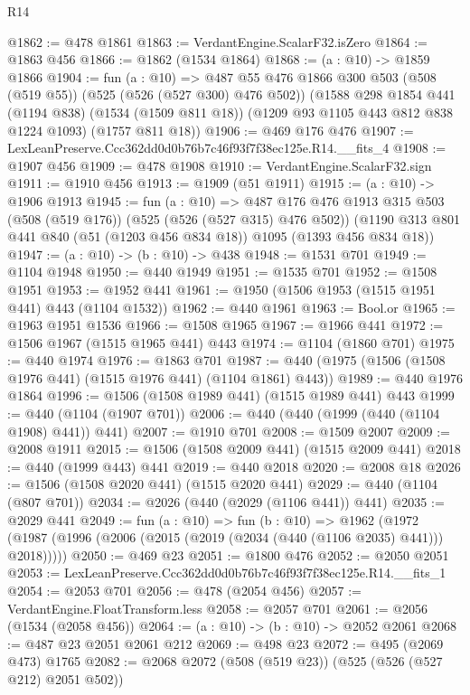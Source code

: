 \begin{lexlean}{R14}
\begin{coremodule}
@1862 := @478 @1861
@1863 := VerdantEngine.ScalarF32.isZero
@1864 := @1863 @456
@1866 := @1862 (@1534 @1864)
@1868 := (a : @10) -> @1859 @1866
@1904 := fun (a : @10) =>
  @487
    @55
    @476
    @1866
    @300
    @503
    (@508 (@519 @55))
    (@525 (@526 (@527 @300) @476 @502))
    (@1588
      @298
      @1854
      @441
      (@1194 @838)
      (@1534 (@1509 @811 @18))
      (@1209 @93 @1105 @443 @812 @838 @1224 @1093)
      (@1757 @811 @18))
@1906 := @469 @176 @476
@1907 := LexLeanPreserve.Ccc362dd0d0b76b7c46f93f7f38ec125e.R14.__fits_4
@1908 := @1907 @456
@1909 := @478 @1908
@1910 := VerdantEngine.ScalarF32.sign
@1911 := @1910 @456
@1913 := @1909 (@51 @1911)
@1915 := (a : @10) -> @1906 @1913
@1945 := fun (a : @10) =>
  @487
    @176
    @476
    @1913
    @315
    @503
    (@508 (@519 @176))
    (@525 (@526 (@527 @315) @476 @502))
    (@1190 @313 @801 @441 @840 (@51 (@1203 @456 @834 @18)) @1095 (@1393 @456 @834 @18))
@1947 := (a : @10) -> (b : @10) -> @438
@1948 := @1531 @701
@1949 := @1104 @1948
@1950 := @440 @1949
@1951 := @1535 @701
@1952 := @1508 @1951
@1953 := @1952 @441
@1961 := @1950 (@1506 @1953 (@1515 @1951 @441) @443 (@1104 @1532))
@1962 := @440 @1961
@1963 := Bool.or
@1965 := @1963 @1951 @1536
@1966 := @1508 @1965
@1967 := @1966 @441
@1972 := @1506 @1967 (@1515 @1965 @441) @443
@1974 := @1104 (@1860 @701)
@1975 := @440 @1974
@1976 := @1863 @701
@1987 := @440 (@1975 (@1506 (@1508 @1976 @441) (@1515 @1976 @441) (@1104 @1861) @443))
@1989 := @440 @1976 @1864
@1996 := @1506 (@1508 @1989 @441) (@1515 @1989 @441) @443
@1999 := @440 (@1104 (@1907 @701))
@2006 := @440 (@440 (@1999 (@440 (@1104 @1908) @441)) @441)
@2007 := @1910 @701
@2008 := @1509 @2007
@2009 := @2008 @1911
@2015 := @1506 (@1508 @2009 @441) (@1515 @2009 @441)
@2018 := @440 (@1999 @443) @441
@2019 := @440 @2018
@2020 := @2008 @18
@2026 := @1506 (@1508 @2020 @441) (@1515 @2020 @441)
@2029 := @440 (@1104 (@807 @701))
@2034 := @2026 (@440 (@2029 (@1106 @441)) @441)
@2035 := @2029 @441
@2049 := fun (a : @10) =>
  fun (b : @10) =>
  @1962 (@1972 (@1987 (@1996 (@2006 (@2015 (@2019 (@2034 (@440 (@1106 @2035) @441))) @2018)))))
@2050 := @469 @23
@2051 := @1800 @476
@2052 := @2050 @2051
@2053 := LexLeanPreserve.Ccc362dd0d0b76b7c46f93f7f38ec125e.R14.__fits_1
@2054 := @2053 @701
@2056 := @478 (@2054 @456)
@2057 := VerdantEngine.FloatTransform.less
@2058 := @2057 @701
@2061 := @2056 (@1534 (@2058 @456))
@2064 := (a : @10) -> (b : @10) -> @2052 @2061
@2068 := @487 @23 @2051 @2061 @212
@2069 := @498 @23
@2072 := @495 (@2069 @473) @1765
@2082 := @2068 @2072 (@508 (@519 @23)) (@525 (@526 (@527 @212) @2051 @502))

\end{coremodule}
\end{lexlean}
